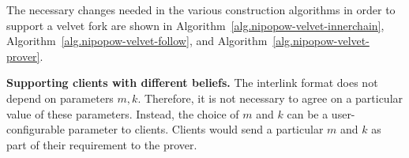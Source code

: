 The necessary changes needed in the various construction algorithms in order to
support a velvet fork are shown in
Algorithm~\ref{alg.nipopow-velvet-innerchain},
Algorithm~\ref{alg.nipopow-velvet-follow}, and
Algorithm~\ref{alg.nipopow-velvet-prover}.

\ifndss\else
\noindent\textbf{Supporting clients with different beliefs.}
The interlink format does not depend on parameters $m, k$. Therefore, it is not
necessary to agree on a particular value of these parameters. Instead, the
choice of $m$ and $k$ can be a user-configurable parameter to clients.
Clients would send a particular $m$ and $k$ as part of their requirement to
the prover.
\fi
